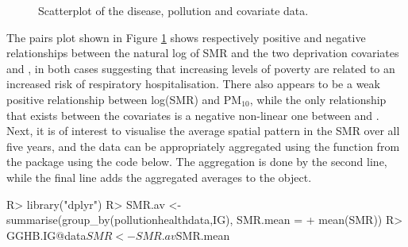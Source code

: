 \documentclass[article, nojss]{jss}
\begin{document}
\begin{figure}
\centering 
{}
\caption{Scatterplot of the disease, pollution and covariate data.\label{pollution_scatterplot}}
\end{figure} 


The pairs plot shown in Figure \ref{pollution_scatterplot} shows respectively positive and negative relationships between the natural log of SMR and the two deprivation covariates  and , in both cases suggesting that increasing levels of poverty are related to an increased risk of respiratory hospitalisation. There also appears to be a weak positive relationship between log(SMR) and PM$_{10}$, while the only relationship that exists between the covariates  is a negative non-linear one between  and . Next, it is of interest to visualise the average spatial pattern in the SMR over all five years, and the data can be appropriately aggregated using the  function from the  package using the code below. The aggregation is done by the second line, while the final line adds the aggregated averages to the   object.


\begin{Schunk}
\begin{Sinput}
R>  library("dplyr")
R>  SMR.av <- summarise(group_by(pollutionhealthdata,IG), SMR.mean = 
+     mean(SMR))
R>  GGHB.IG@data$SMR <- SMR.av$SMR.mean
\end{Sinput}
\end{Schunk}
\end{document}
